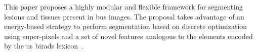%

This paper proposes a highly modular and flexible framework for segmenting lesions and tissues present in \ac{bus} images.
The proposal takes advantage of an energy-based strategy to perform segmentation based on discrete optimization using super-pixels and a set of novel features analogous to the elements encoded by the \ac{us} \ac{birads} lexicon~\cite{biradsus}.

